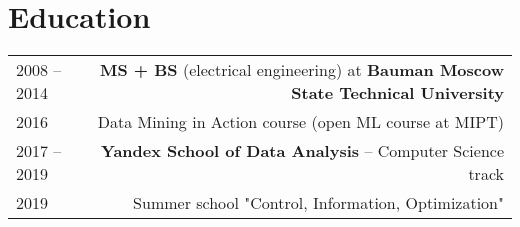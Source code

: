 \section*{Education}
\begin{tabular}{@{}L!{\VRule}R}
    2008 -- 2014 & \textbf{MS + BS} (electrical engineering) at \textbf{Bauman Moscow State Technical University} \\
    2016         & Data Mining in Action course (open ML course at MIPT)                                          \\
    2017 -- 2019 & \textbf{Yandex School of Data Analysis} -- Computer Science track    \\
    2019 & Summer school "Control, Information, Optimization"
\end{tabular}